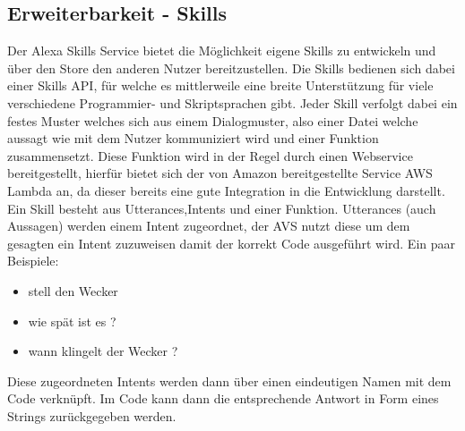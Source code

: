 \subsection{Erweiterbarkeit - Skills}
Der Alexa Skills Service bietet die Möglichkeit eigene Skills zu entwickeln und über den Store den anderen Nutzer bereitzustellen. Die Skills bedienen sich dabei einer Skills API, für welche es mittlerweile eine breite Unterstützung für viele verschiedene Programmier- und Skriptsprachen gibt. Jeder Skill verfolgt dabei ein festes Muster welches sich aus einem Dialogmuster, also einer Datei welche aussagt wie mit dem Nutzer kommuniziert wird und einer Funktion zusammensetzt. Diese Funktion wird in der Regel durch einen Webservice bereitgestellt, hierfür bietet sich der von Amazon bereitgestellte Service AWS Lambda an, da dieser bereits eine gute Integration in die Entwicklung darstellt.\\

Ein Skill besteht aus Utterances,Intents und einer Funktion. Utterances (auch Aussagen) werden einem Intent zugeordnet, der AVS nutzt diese um dem gesagten ein Intent zuzuweisen damit der korrekt Code ausgeführt wird. Ein paar Beispiele:
\begin{itemize}
	\item stell den Wecker
	\item wie spät ist es ?
	\item wann klingelt der Wecker ?
\end{itemize}
Diese zugeordneten Intents werden dann über einen eindeutigen Namen mit dem Code verknüpft. Im Code kann dann die entsprechende Antwort in Form eines Strings zurückgegeben werden.
